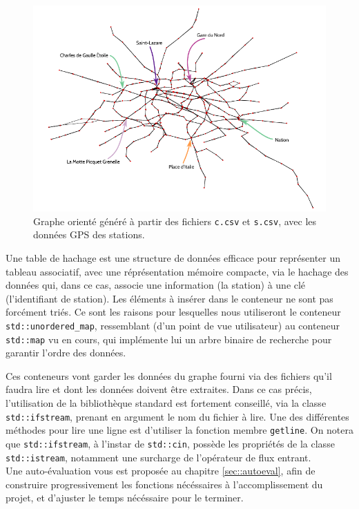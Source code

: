 \documentclass[9pts]{article}
\begin{document}
\begin{figure}[h]
   \centering
   \includegraphics[width=18cm,keepaspectratio]{ratp_graph.pdf}
   \caption{\label{directed_graph} Graphe orienté généré à partir des fichiers \texttt{c.csv} et \texttt{s.csv}, avec les données GPS des stations.}
\end{figure}

Une table de hachage est une structure de données efficace pour représenter un tableau associatif, avec une réprésentation mémoire compacte, via le hachage des données qui, dans ce cas, associe une information (la station) à une clé (l'identifiant de station). Les éléments à insérer dans le conteneur ne sont pas forcément triés. Ce sont les raisons pour lesquelles nous utiliseront le conteneur \texttt{std::unordered\_map}, ressemblant (d'un point de vue utilisateur) au conteneur \texttt{std::map} vu en cours, qui implémente lui un arbre binaire de recherche pour garantir l'ordre des données.

Ces conteneurs vont garder les données du graphe fourni via des fichiers qu'il faudra lire et dont les données doivent être extraites.
Dans ce cas précis, l'utilisation de la bibliothèque standard est fortement conseillé, via la classe \texttt{std::ifstream}, prenant en argument le nom du fichier à lire. Une des différentes méthodes pour lire une ligne est d'utiliser la fonction membre \texttt{getline}. On notera que \texttt{std::ifstream}, à l'instar de \texttt{std::cin}, possède les propriétés de la classe \texttt{std::istream}, notamment une surcharge de l'opérateur de flux entrant.\\

Une auto-évaluation vous est proposée au chapitre \ref{sec::autoeval}, afin de construire progressivement les fonctions nécéssaires à l'accomplissement du projet, et d'ajuster le temps nécéssaire pour le terminer.
\end{document}
